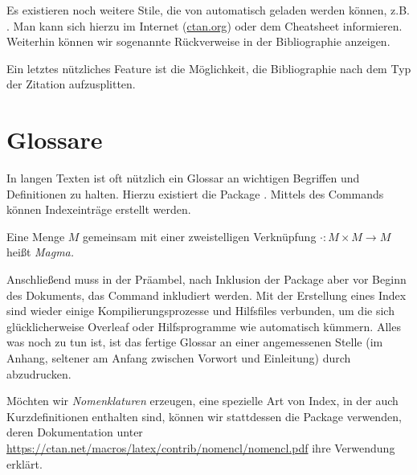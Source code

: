 Es existieren noch weitere Stile, die von  automatisch geladen werden können, z.B. .
Man kann sich hierzu im Internet (\url{ctan.org}) oder dem Cheatsheet informieren.
Weiterhin können wir sogenannte Rückverweise in der Bibliographie anzeigen.
\begin{latexlisting}
	\usepackage[backref=true]{biblatex}
\end{latexlisting}
Ein letztes nützliches Feature ist die Möglichkeit, die Bibliographie nach dem Typ der Zitation aufzusplitten.
\begin{latexlisting}
	\printbibliography[title={Bücher}, type=books]
	\printbibliography[title={Andere Quellen}, nottype=books]
\end{latexlisting}

\section{Glossare}
In langen Texten ist oft nützlich ein Glossar an wichtigen Begriffen und Definitionen zu halten.
Hierzu existiert die Package .
Mittels des Commands  können Indexeinträge erstellt werden.
\begin{latexlisting}
	\begin{definition}[Magma]\label{def:magma}
		Eine Menge $M$ gemeinsam mit einer zweistelligen Verknüpfung $\cdot: M \times M \to M$ heißt \emph{Magma.}
	\end{definition}
\end{latexlisting}
Anschließend muss in der Präambel, nach Inklusion der Package aber vor Beginn des Dokuments, das Command  inkludiert werden.
Mit der Erstellung eines Index sind wieder einige Kompilierungsprozesse und Hilfsfiles verbunden, um die sich glücklicherweise Overleaf oder Hilfsprogramme wie  automatisch kümmern.
Alles was noch zu tun ist, ist das fertige Glossar an einer angemessenen Stelle (im Anhang, seltener am Anfang zwischen Vorwort und Einleitung) durch  abzudrucken.

Möchten wir \emph{Nomenklaturen} erzeugen, eine spezielle Art von Index, in der auch Kurzdefinitionen enthalten sind, können wir stattdessen die Package  verwenden, deren Dokumentation unter \url{https://ctan.net/macros/latex/contrib/nomencl/nomencl.pdf} ihre Verwendung erklärt.
